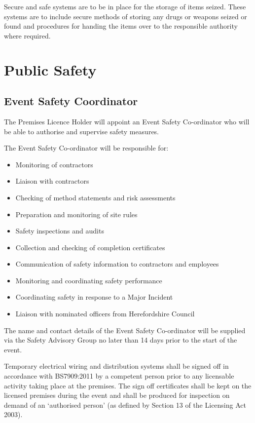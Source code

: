 Secure and safe systems are to be in place for the storage of items
seized. These systems are to include secure methods of storing any
drugs or weapons seized or found and procedures for handing the items
over to the responsible authority where required.

\section{Public Safety}

\subsection{Event Safety Coordinator}

The Premises Licence Holder will appoint an Event Safety Co-ordinator
who will be able to authorise and supervise safety measures.

The Event Safety Co-ordinator will be responsible for:

\begin{itemize}
\tightlist
\item
  Monitoring of contractors
\item
  Liaison with contractors
\item
  Checking of method statements and risk assessments
\item
  Preparation and monitoring of site rules
\item
  Safety inspections and audits
\item
  Collection and checking of completion certificates
\item
  Communication of safety information to contractors and employees
\item
  Monitoring and coordinating safety performance
\item
  Coordinating safety in response to a Major Incident
\item
  Liaison with nominated officers from Herefordshire Council
\end{itemize}

The name and contact details of the Event Safety Co-ordinator will be
supplied via the Safety Advisory Group no later than 14 days prior to
the start of the event.

Temporary electrical wiring and distribution systems shall be signed off
in accordance with BS7909:2011 by a competent person prior to any
licensable activity taking place at the premises. The sign off
certificates shall be kept on the licensed premises during the event and
shall be produced for inspection on demand of an `authorised person' (as
defined by Section 13 of the Licensing Act 2003).

